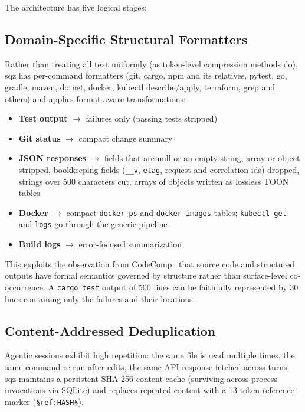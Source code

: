 \documentclass[10pt,twocolumn]{article}
\begin{document}
The architecture has five logical stages:

\subsection{Domain-Specific Structural Formatters}

Rather than treating all text uniformly (as token-level compression methods do), sqz has per-command formatters (git, cargo, npm and its relatives, pytest, go, gradle, maven, dotnet, docker, kubectl describe/apply, terraform, grep and others) and applies format-aware transformations:

\begin{itemize}
  \item \textbf{Test output} $\rightarrow$ failures only (passing tests stripped)
  \item \textbf{Git status} $\rightarrow$ compact change summary
  \item \textbf{JSON responses} $\rightarrow$ fields that are null or an empty string, array or object stripped, bookkeeping fields (\texttt{\_\_v}, \texttt{etag}, request and correlation ids) dropped, strings over 500 characters cut, arrays of objects written as lossless TOON tables
  \item \textbf{Docker} $\rightarrow$ compact \texttt{docker ps} and \texttt{docker images} tables; \texttt{kubectl get} and \texttt{logs} go through the generic pipeline
  \item \textbf{Build logs} $\rightarrow$ error-focused summarization
\end{itemize}

This exploits the observation from CodeComp~\cite{chen2025codecomp} that source code and structured outputs have formal semantics governed by structure rather than surface-level co-occurrence. A \texttt{cargo test} output of 500 lines can be faithfully represented by 30 lines containing only the failures and their locations.

\subsection{Content-Addressed Deduplication}

Agentic sessions exhibit high repetition: the same file is read multiple times, the same command re-run after edits, the same API response fetched across turns. sqz maintains a persistent SHA-256 content cache (surviving across process invocations via SQLite) and replaces repeated content with a 13-token reference marker (\texttt{\S ref:HASH\S}).
\end{document}
